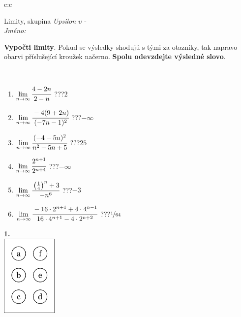 \documentclass[10pt]{report}
\begin{document}
\begin{tabular}{c:c}
\begin{minipage}[c][104.5mm][t]{0.5\linewidth}
\begin{center}
\vspace{7mm}
{\huge Limity, skupina \textit{Upsilon $\upsilon$} -}\\[5mm]
\textit{Jméno:}\phantom{xxxxxxxxxxxxxxxxxxxxxxxxxxxxxxxxxxxxxxxxxxxxxxxxxxxxxxxxxxxxxxxxx}\\[5mm]
\begin{minipage}{0.95\linewidth}
\begin{center}
\textbf{Vypočti limity}. Pokud se výsledky shodujú s tými za otazníky, tak napravo\\obarvi příslušející kroužek načerno. \textbf{Spolu odevzdejte výsledné slovo}.
\end{center}
\end{minipage}
\\[1mm]
\begin{minipage}{0.79\linewidth}
\begin{center}
\begin{varwidth}{\linewidth}
\begin{enumerate}
\normalsize
\item $\lim\limits_{n\to\infty}\cfrac{4-2n}{2-n}$\quad \dotfill\; ???\;\dotfill \quad $2$
\item $\lim\limits_{n\to\infty}\cfrac{-4(9+2n)}{(-7n-1)^2}$\quad \dotfill\; ???\;\dotfill \quad $-\infty$
\item $\lim\limits_{n\to\infty}\cfrac{(-4-5n)^2}{n^2-5n+5}$\quad \dotfill\; ???\;\dotfill \quad $25$
\item $\lim\limits_{n\to\infty}\cfrac{2^{n+1}}{2^{n+4}}$\quad \dotfill\; ???\;\dotfill \quad $-\infty$
\item $\lim\limits_{n\to\infty}\cfrac{\left(\frac{1}{4}\right)^n +3}{-n^{6}}$\quad \dotfill\; ???\;\dotfill \quad $-3$
\item $\lim\limits_{n\to\infty}\cfrac{-16\cdot 2^{n+1}+4\cdot 4^{n-1}}{16\cdot 4^{n+1}-4\cdot 2^{n+2}}$\quad \dotfill\; ???\;\dotfill \quad $\nicefrac{1}{64}$
\end{enumerate}
\end{varwidth}
\end{center}
\end{minipage}
\begin{minipage}{0.20\linewidth}
\begin{center}
{\Huge\bfseries 1.} \\[2mm]
\includegraphics[height=40mm]{../images/braille.png}

\end{center}
\end{minipage}
\end{center}
\end{minipage}
\end{tabular}
\end{document}

